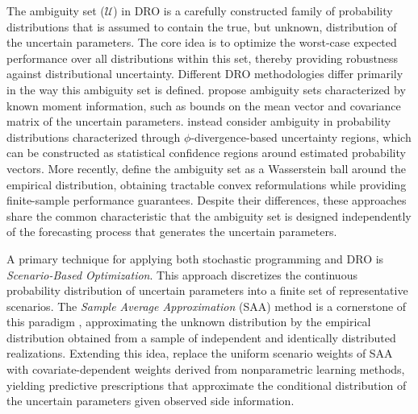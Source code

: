 \documentclass[mnsc,sglanonrev]{informs4}  %
\theoremstyle{remark}\newtheorem{remark}{Remark}
\begin{document}
The ambiguity set ($\mathcal{U}$) in DRO is a carefully constructed family of probability distributions that is assumed to contain the true, but unknown, distribution of the uncertain parameters. The core idea is to optimize the worst-case expected performance over all distributions within this set, thereby providing robustness against distributional uncertainty. Different DRO methodologies differ primarily in the way this ambiguity set is defined. \citet{DY10} propose ambiguity sets characterized by known moment information, such as bounds on the mean vector and covariance matrix of the uncertain parameters. \citet{BTGN13} instead consider ambiguity in probability distributions characterized through $\phi$-divergence-based uncertainty regions, which can be constructed as statistical confidence regions around estimated probability vectors. More recently, \citet{EK18} define the ambiguity set as a Wasserstein ball around the empirical distribution, obtaining tractable convex reformulations while providing finite-sample performance guarantees. Despite their differences, these approaches share the common characteristic that the ambiguity set is designed independently of the forecasting process that generates the uncertain parameters.

A primary technique for applying both stochastic programming and DRO is {\it Scenario-Based Optimization}. This approach discretizes the continuous probability distribution of uncertain parameters into a finite set of representative scenarios. The {\it Sample Average Approximation} (SAA) method is a cornerstone of this paradigm \citep{SH98}, approximating the unknown distribution by the empirical distribution obtained from a sample of independent and identically distributed realizations. Extending this idea, \citet{BK19} replace the uniform scenario weights of SAA with covariate-dependent weights derived from nonparametric learning methods, yielding predictive prescriptions that approximate the conditional distribution of the uncertain parameters given observed side information.
\end{document}
